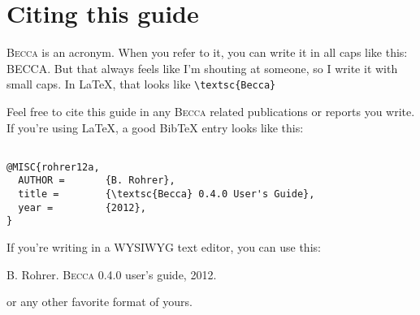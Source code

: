 \chapter{Citing this guide}

\textsc{Becca} is an acronym. When you refer to it, you can write it in all caps like this: BECCA. But that always feels like I'm shouting at someone, so I write it with small caps. In \LaTeX, that looks like \verb+\textsc{Becca} +

Feel free to cite this guide in any \textsc{Becca} related publications or reports you write. If you're using \LaTeX, a good BibTeX entry looks like this:

\begin{verbatim}

@MISC{rohrer12a,
  AUTHOR =       {B. Rohrer},
  title =        {\textsc{Becca} 0.4.0 User's Guide},
  year =         {2012},
}

\end{verbatim}

If you're writing in a WYSIWYG text editor, you can use this:

B. Rohrer. \textsc{Becca} 0.4.0 user's guide, 2012.

or any other favorite format of yours. 



 
